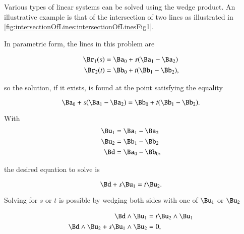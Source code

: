 %
%
Various types of linear systems can be solved using the wedge product.
An illustrative example is that of the intersection of two lines as illustrated in \cref{fig:intersectionOfLines:intersectionOfLinesFig1}.


In parametric form, the lines in this problem are

\begin{dmath}\label{eqn:solutionOfLinearSystem:1000}
\begin{aligned}
\Br_1(s) &= \Ba_0 + s( \Ba_1 - \Ba_2 ) \\
\Br_2(t) &= \Bb_0 + t( \Bb_1 - \Bb_2 ),
\end{aligned}
\end{dmath}

so the solution, if it exists, is found at the point satisfying the equality

\begin{dmath}\label{eqn:solutionOfLinearSystem:1020}
\Ba_0 + s( \Ba_1 - \Ba_2 ) = \Bb_0 + t( \Bb_1 - \Bb_2 ).
\end{dmath}

With
\begin{dmath}\label{eqn:solutionOfLinearSystem:1040}
\begin{aligned}
\Bu_1 &= \Ba_1 - \Ba_2 \\
\Bu_2 &= \Bb_1 - \Bb_2 \\
\Bd &= \Ba_0 - \Bb_0,
\end{aligned}
\end{dmath}

the desired equation to solve is

\begin{dmath}\label{eqn:solutionOfLinearSystem:1060}
\Bd + s \Bu_1 = t \Bu_2.
\end{dmath}

Solving for \( s \) or \( t \) is possible by
wedging both sides with one of \( \Bu_1 \) or \( \Bu_2 \)

\begin{dmath}\label{eqn:solutionOfLinearSystem:1080}
\begin{aligned}
\Bd \wedge \Bu_1 &= t \Bu_2 \wedge \Bu_1 \\
\Bd \wedge \Bu_2 + s \Bu_1 \wedge \Bu_2 &= 0,
\end{aligned}
\end{dmath}

